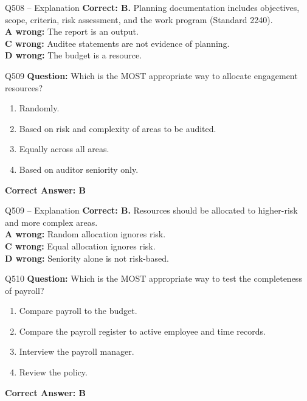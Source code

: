 \documentclass[aspectratio=169,10pt]{beamer}
\begin{document}
	\begin{frame}[t]{Q508 -- Explanation}
		\small
		\textbf{Correct: B.} Planning documentation includes objectives, scope, criteria, risk assessment, and the work program (Standard 2240). \\[4pt]
		\textbf{A wrong:} The report is an output. \\[2pt]
		\textbf{C wrong:} Auditee statements are not evidence of planning. \\[2pt]
		\textbf{D wrong:} The budget is a resource.
	\end{frame}
	
	\begin{frame}[t]{Q509}
		\small
		\textbf{Question:} Which is the MOST appropriate way to allocate engagement resources?
		\begin{enumerate}[label=\Alph*.,itemsep=1pt,topsep=2pt]
			\item Randomly.
			\item Based on risk and complexity of areas to be audited.
			\item Equally across all areas.
			\item Based on auditor seniority only.
		\end{enumerate}
		\vspace{4pt}
		\textbf{Correct Answer: B}
	\end{frame}
	
	\begin{frame}[t]{Q509 -- Explanation}
		\small
		\textbf{Correct: B.} Resources should be allocated to higher-risk and more complex areas. \\[4pt]
		\textbf{A wrong:} Random allocation ignores risk. \\[2pt]
		\textbf{C wrong:} Equal allocation ignores risk. \\[2pt]
		\textbf{D wrong:} Seniority alone is not risk-based.
	\end{frame}
	
	\begin{frame}[t]{Q510}
		\small
		\textbf{Question:} Which is the MOST appropriate way to test the completeness of payroll?
		\begin{enumerate}[label=\Alph*.,itemsep=1pt,topsep=2pt]
			\item Compare payroll to the budget.
			\item Compare the payroll register to active employee and time records.
			\item Interview the payroll manager.
			\item Review the policy.
		\end{enumerate}
		\vspace{4pt}
		\textbf{Correct Answer: B}
	\end{frame}
	
\end{document}

